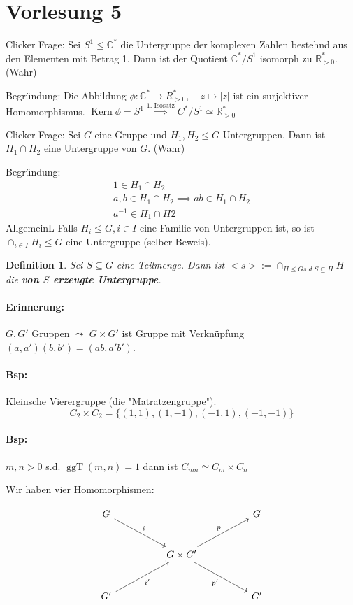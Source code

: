 \documentclass{article}
\theoremstyle{plain}
\newtheorem{definition}{Definition}
\renewcommand{\ker}{\mathop{\mathrm{Kern}}}
\newcommand{\defn}[1]{\textbf{#1}}
\newcommand{\defeq}{:=}
\newcommand{\R}{\mathbb{R}}
\newcommand{\C}{\mathbb{C}}
\newcommand{\ug}{\leq}
\newcommand{\zykl}[1]{{<}{#1}{>}}
\newcommand{\ggt}{\mathop{\text{ggT}}}
\newcommand{\iso}{\simeq}
\begin{document}
\section*{Vorlesung 5}

Clicker Frage: Sei $S^1 \ug \C^*$ die Untergruppe der komplexen Zahlen bestehnd aus den Elementen mit Betrag 1. Dann ist der Quotient $\C^*/S^1$ isomorph zu $\R^*_{>0}$. (Wahr)

Begründung:
Die Abbildung $\phi\colon\C^*\to R^*_{>0}, \quad z\mapsto |z|$ ist ein surjektiver Homomorphismus. 
$\ker\phi=S^1 \overset{\text{1. Isosatz}}{\implies} C^*/S^1\iso \R^*_{>0}$

Clicker Frage: Sei $G$ eine Gruppe und $H_1,H_2\ug G$ Untergruppen. Dann ist $H_1\cap H_2$ eine Untergruppe von $G$. (Wahr)

Begründung:
\begin{gather*}
    1\in H_1\cap H_2\\
    a,b\in H_1\cap H_2\implies ab\in H_1\cap H_2\\
    a^{-1}\in H_1\cap H2
\end{gather*}
AllgemeinL Falls $H_i\ug G, i\in I$ eine Familie von Untergruppen ist, so ist $\cap_{i\in I}H_i\ug G$ eine Untergruppe (selber Beweis).

\begin{definition}
    Sei $S\subseteq G$ eine Teilmenge. Dann ist $\zykl{s}\defeq \cap_{H\ug G s.d. S\subseteq H}H$ die \defn{von $S$ erzeugte Untergruppe}.
\end{definition}
\paragraph{Erinnerung:} $G,G'$ Gruppen $\leadsto$ $G\times G'$ ist Gruppe mit Verknüpfung $(a,a')(b,b')=(ab,a'b')$.
\paragraph{Bsp:} Kleinsche Vierergruppe (die "Matratzengruppe").
$$C_2\times C_2 =\{(1,1),(1,-1),(-1,1),(-1,-1)\}$$
\paragraph{Bsp:} $m,n>0$ s.d. $\ggt(m,n)=1$ dann ist $C_{mn}\iso C_m\times C_n$

Wir haben vier Homomorphismen:

\[
\begin{tikzcd}[row sep=large, column sep=huge]
G \arrow[dr,"i"] & & G \\
& G\times G' \arrow[ur,"p"] \arrow[dr,swap,"p'"] & \\
G' \arrow[ur,swap,"i'"] & & G'
\end{tikzcd}
\]
\end{document}
